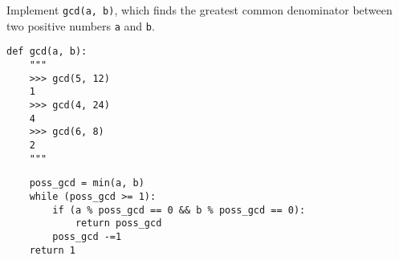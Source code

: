 \begin{blocksection}
\question Implement \lstinline$gcd(a, b)$, which finds the greatest common denominator between two positive numbers \lstinline$a$ and \lstinline$b$.

\begin{lstlisting}
def gcd(a, b):
    """
    >>> gcd(5, 12)
    1
    >>> gcd(4, 24)
    4
    >>> gcd(6, 8)
    2
    """
\end{lstlisting}
\begin{solution}[2in]
\begin{lstlisting}
    poss_gcd = min(a, b)
    while (poss_gcd >= 1):
        if (a % poss_gcd == 0 && b % poss_gcd == 0):
            return poss_gcd
        poss_gcd -=1
    return 1
\end{lstlisting}
\end{solution}
\end{blocksection}
